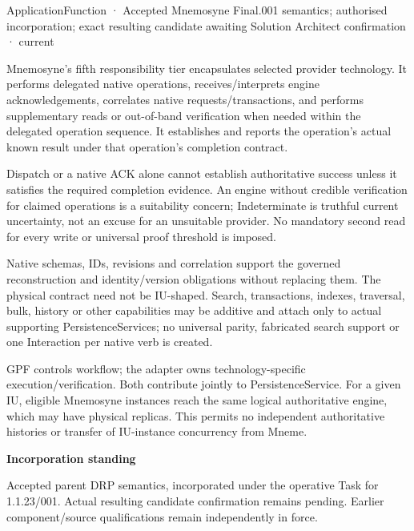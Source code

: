 \label{element:000f7241f12f411195b39fe8b8386e05}
{\small ApplicationFunction · Accepted Mnemosyne Final.001 semantics; authorised incorporation; exact resulting candidate awaiting Solution Architect confirmation · current}\par

Mnemosyne's fifth responsibility tier encapsulates selected provider technology. It performs delegated native operations, receives/interprets engine acknowledgements, correlates native requests/transactions, and performs supplementary reads or out-of-band verification when needed within the delegated operation sequence. It establishes and reports the operation's actual known result under that operation's completion contract.



Dispatch or a native ACK alone cannot establish authoritative success unless it satisfies the required completion evidence. An engine without credible verification for claimed operations is a suitability concern; Indeterminate is truthful current uncertainty, not an excuse for an unsuitable provider. No mandatory second read for every write or universal proof threshold is imposed.



Native schemas, IDs, revisions and correlation support the governed reconstruction and identity/version obligations without replacing them. The physical contract need not be IU-shaped. Search, transactions, indexes, traversal, bulk, history or other capabilities may be additive and attach only to actual supporting PersistenceServices; no universal parity, fabricated search support or one Interaction per native verb is created.



GPF controls workflow; the adapter owns technology-specific execution/verification. Both contribute jointly to PersistenceService. For a given IU, eligible Mnemosyne instances reach the same logical authoritative engine, which may have physical replicas. This permits no independent authoritative histories or transfer of IU-instance concurrency from Mneme.



\par\medskip\textbf{Incorporation standing}\par


Accepted parent DRP semantics, incorporated under the operative Task for 1.1.23/001. Actual resulting candidate confirmation remains pending. Earlier component/source qualifications remain independently in force.


